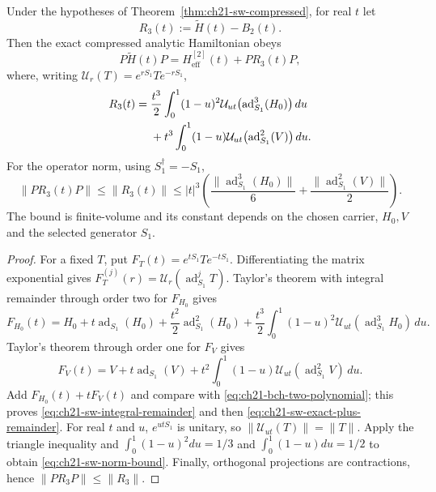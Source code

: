 \begin{proposition}
\label{prop:ch21-sw-analytic-remainder}
Under the hypotheses of Theorem~\ref{thm:ch21-sw-compressed}, for real
$t$ let
\begin{equation}
 R_3(t):=\widetilde H(t)-B_2(t).
\label{eq:ch21-rem-definition}
\end{equation}
Then the exact compressed analytic Hamiltonian obeys
\begin{equation}
 P\widetilde H(t)P=H_{\mathrm{eff}}^{[2]}(t)+PR_3(t)P,
\label{eq:ch21-sw-exact-plus-remainder}
\end{equation}
where, writing $\mathcal U_r(T)=e^{rS_1}Te^{-rS_1}$,
\begin{align}
R_3(t)={}&\frac{t^3}{2}\int_0^1(1-u)^2
  \mathcal U_{ut}\bigl(\operatorname{ad}_{S_1}^3(H_0)\bigr)\,du\notag\\
 &+t^3\int_0^1(1-u)
  \mathcal U_{ut}\bigl(\operatorname{ad}_{S_1}^2(V)\bigr)\,du.
\label{eq:ch21-sw-integral-remainder}
\end{align}
For the operator norm, using $S_1^\dagger=-S_1$,
\begin{equation}
\|PR_3(t)P\|\leq\|R_3(t)\|
\leq |t|^3\left(
\frac{\|\operatorname{ad}_{S_1}^3(H_0)\|}{6}
+\frac{\|\operatorname{ad}_{S_1}^2(V)\|}{2}\right).
\label{eq:ch21-sw-norm-bound}
\end{equation}
The bound is finite-volume and its constant depends on the chosen
carrier, $H_0,V$ and the selected generator $S_1$.
\end{proposition}
\begin{proof}
For a fixed $T$, put $F_T(t)=e^{tS_1}Te^{-tS_1}$.
Differentiating the matrix exponential gives
$F_T^{(j)}(r)=\mathcal U_r(\operatorname{ad}_{S_1}^jT)$.
Taylor's theorem with integral remainder through order two for
$F_{H_0}$ gives
\begin{equation*}
F_{H_0}(t)=H_0+t\operatorname{ad}_{S_1}(H_0)
+\frac{t^2}{2}\operatorname{ad}_{S_1}^2(H_0)
+\frac{t^3}{2}\int_0^1(1-u)^2
  \mathcal U_{ut}(\operatorname{ad}_{S_1}^3H_0)\,du.
\end{equation*}
Taylor's theorem through order one for $F_V$ gives
\begin{equation*}
F_V(t)=V+t\operatorname{ad}_{S_1}(V)
+t^2\int_0^1(1-u)
 \mathcal U_{ut}(\operatorname{ad}_{S_1}^2V)\,du.
\end{equation*}
Add $F_{H_0}(t)+tF_V(t)$ and compare with
\eqref{eq:ch21-bch-two-polynomial}; this proves
\eqref{eq:ch21-sw-integral-remainder} and then
\eqref{eq:ch21-sw-exact-plus-remainder}.
For real $t$ and $u$, $e^{utS_1}$ is unitary, so
$\|\mathcal U_{ut}(T)\|=\|T\|$.  Apply the triangle inequality and
$\int_0^1(1-u)^2du=1/3$ and
$\int_0^1(1-u)du=1/2$ to obtain
\eqref{eq:ch21-sw-norm-bound}.  Finally, orthogonal projections are
contractions, hence $\|PR_3P\|\leq\|R_3\|$.
\end{proof}

